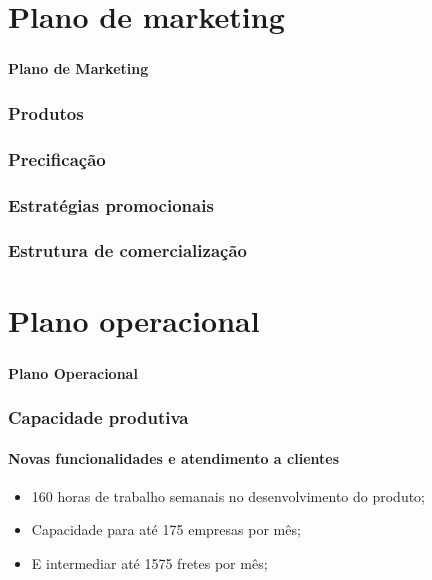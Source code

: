 \documentclass{beamer}
\begin{document}
\section{Plano de marketing}

\begin{frame}
  \frametitle{}
  \framesubtitle{}

  \begin{center}
    {\huge\textbf{Plano de Marketing}}
  \end{center}
\end{frame}

\begin{frame}
  \frametitle{Produtos}
  \framesubtitle{}

\end{frame}

\begin{frame}
  \frametitle{Precificação}
  \framesubtitle{}

\end{frame}

\begin{frame}
  \frametitle{Estratégias promocionais}
  \framesubtitle{}

\end{frame}

\begin{frame}
  \frametitle{Estrutura de comercialização}
  \framesubtitle{}

\end{frame}

\section{Plano operacional}
\begin{frame}
  \frametitle{}
  \framesubtitle{}

  \begin{center}
    {\huge\textbf{Plano Operacional}}
  \end{center}
\end{frame}

\begin{frame}
  \frametitle{Capacidade produtiva}
  \framesubtitle{Novas funcionalidades e atendimento a clientes}

  \begin{itemize}
    \item 160 horas de trabalho semanais no desenvolvimento do produto;
    \item Capacidade para até 175 empresas por mês;
    \item E intermediar até 1575 fretes por mês;
  \end{itemize}

\end{frame}
\end{document}
